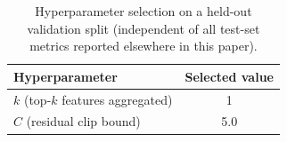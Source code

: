 \begin{table}[t]
\centering
\caption{Hyperparameter selection on a held-out validation split
(independent of all test-set metrics reported elsewhere in this paper).}
\label{tab:hyperparam-validation}
\begin{tabular}{lc}
\toprule
\textbf{Hyperparameter} & \textbf{Selected value} \\
\midrule
$k$ (top-$k$ features aggregated) & 1 \\
$C$ (residual clip bound)         & 5.0 \\
\bottomrule
\end{tabular}

\vspace{4pt}
\footnotesize
\end{table}
